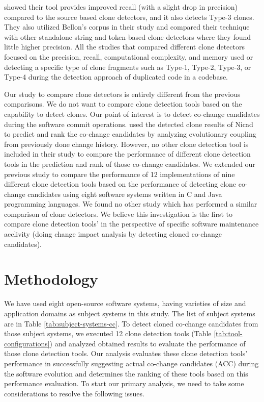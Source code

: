 \documentclass[review]{elsarticle}
\begin{document}
\citet{CloneIntermediateRepresentationBallon} showed their tool provides improved recall (with a slight drop in precision) compared to the source based clone detectors, and it also detects Type-3 clones. They also utilized Bellon’s corpus in their study and compared their technique with other standalone string and token-based clone detectors where they found little higher precision. All the studies that compared different clone detectors focused on the precision, recall, computational complexity, and memory used or detecting a specific type of clone fragments such as Type-1, Type-2, Type-3, or Type-4 during the detection approach of duplicated code in a codebase. 

Our study to compare clone detectors is entirely different from the previous comparisons. We do not want to compare clone detection tools based on the capability to detect clones. Our point of interest is to detect co-change candidates during the software commit operations. \citet{Mondal-2014-PRC-2597073-2597104rankingCoChange} used the detected clone results of Nicad to predict and rank the co-change candidates by analyzing evolutionary coupling from previously done change history. However, no other clone detection tool is included in their study to compare the performance of different clone detection tools in the prediction and rank of those co-change candidates. We extended our previous study \cite{nadim-iwsc-2020} to compare the performance of 12 implementations of nine different clone detection tools based on the performance of detecting clone co-change candidates using eight software systems written in C and Java programming languages.  We found no other study which has performed a similar comparison of clone detectors. We believe this investigation is the first to compare clone detection tools' in the perspective of specific software maintenance acclivity (doing change impact analysis by detecting cloned co-change candidates). 

\section{Methodology}
\label{the-methodology}
We have used eight open-source software systems, having varieties of size and application domains as subject systems in this study. The list of subject systems are in Table \ref{tab:subject-systems-cc}. To detect cloned co-change candidates from those subject systems, we executed 12 clone detection tools (Table \ref{tab:tool-configurations}) and analyzed obtained results to evaluate the performance of those clone detection tools. Our analysis evaluates these clone detection tools' performance in successfully suggesting actual co-change candidates (ACC) during the software evolution and determines the ranking of these tools based on this performance evaluation. To start our primary analysis, we need to take some considerations to resolve the following issues. 
\end{document}
